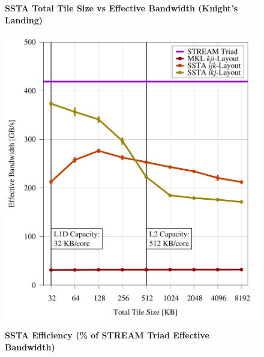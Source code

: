 \documentclass{sig-alternate-05-2015}
\begin{document}
\begin{figure}[!bth]
  \captionsetup{width=0.39\textwidth}
  \begin{minipage}{0.49\textwidth}
    \centering
    \label{fig:results:tile_size_knl}
    \caption{
      \textbf{SSTA Total Tile Size vs Effective Bandwidth (Knight's Landing)}
    }
    \includegraphics[width=0.95\columnwidth]{figures/post_tsb_tw_sweep_full_matrix_double_precision_production_carl_knl_7210_09_02_2016_64pus.pdf}
  \end{minipage}
  \begin{minipage}{0.49\textwidth}
    \centering
    \label{fig:results:efficiency}
    \caption{
      \textbf{SSTA Efficiency (\% of STREAM Triad Effective Bandwidth)}
    }

\end{minipage}
\end{figure}
\end{document}

